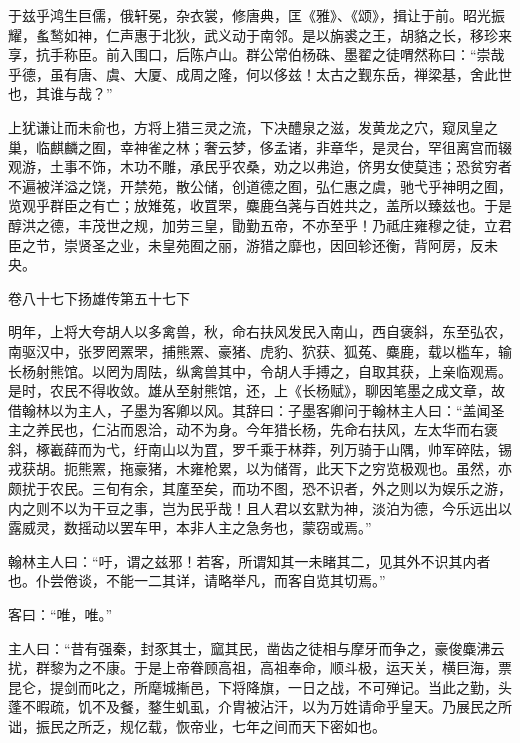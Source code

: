 \documentclass[12pt,UTF8]{ctexbook}
\begin{document}
于兹乎鸿生巨儒，俄轩冕，杂衣裳，修唐典，匡《雅》、《颂》，揖让于前。昭光振耀，蚃鹙如神，仁声惠于北狄，武义动于南邻。是以旃裘之王，胡貉之长，移珍来享，抗手称臣。前入围口，后陈卢山。群公常伯杨硃、墨翟之徒喟然称曰：“崇哉乎德，虽有唐、虞、大厦、成周之隆，何以侈兹！太古之觐东岳，禅梁基，舍此世也，其谁与哉？”



上犹谦让而未俞也，方将上猎三灵之流，下决醴泉之滋，发黄龙之穴，窥凤皇之巢，临麒麟之囿，幸神雀之林；奢云梦，侈孟诸，非章华，是灵台，罕徂离宫而辍观游，土事不饰，木功不雕，承民乎农桑，劝之以弗迨，侪男女使莫违；恐贫穷者不遍被洋溢之饶，开禁苑，散公储，创道德之囿，弘仁惠之虞，驰弋乎神明之囿，览观乎群臣之有亡；放雉菟，收罝罘，麋鹿刍荛与百姓共之，盖所以臻兹也。于是醇洪之德，丰茂世之规，加劳三皇，勖勤五帝，不亦至乎！乃祗庄雍穆之徒，立君臣之节，崇贤圣之业，未皇苑囿之丽，游猎之靡也，因回轸还衡，背阿房，反未央。





卷八十七下扬雄传第五十七下



明年，上将大夸胡人以多禽兽，秋，命右扶风发民入南山，西自褒斜，东至弘农，南驱汉中，张罗罔罴罘，捕熊罴、豪猪、虎豹、狖获、狐菟、麋鹿，载以槛车，输长杨射熊馆。以罔为周阹，纵禽兽其中，令胡人手搏之，自取其获，上亲临观焉。是时，农民不得收敛。雄从至射熊馆，还，上《长杨赋》，聊因笔墨之成文章，故借翰林以为主人，子墨为客卿以风。其辞曰：子墨客卿问于翰林主人曰：“盖闻圣主之养民也，仁沾而恩洽，动不为身。今年猎长杨，先命右扶风，左太华而右褒斜，椓嶻薛而为弋，纡南山以为罝，罗千乘于林莽，列万骑于山隅，帅军碎阹，锡戎获胡。扼熊罴，拖豪猪，木雍枪累，以为储胥，此天下之穷览极观也。虽然，亦颇扰于农民。三旬有余，其廑至矣，而功不图，恐不识者，外之则以为娱乐之游，内之则不以为干豆之事，岂为民乎哉！且人君以玄默为神，淡泊为德，今乐远出以露威灵，数摇动以罢车甲，本非人主之急务也，蒙窃或焉。”



翰林主人曰：“吁，谓之兹邪！若客，所谓知其一未睹其二，见其外不识其内者也。仆尝倦谈，不能一二其详，请略举凡，而客自览其切焉。”



客曰：“唯，唯。”



主人曰：“昔有强秦，封豕其士，窳其民，凿齿之徒相与摩牙而争之，豪俊麋沸云扰，群黎为之不康。于是上帝眷顾高祖，高祖奉命，顺斗极，运天关，横巨海，票昆仑，提剑而叱之，所麾城摲邑，下将降旗，一日之战，不可殚记。当此之勤，头蓬不暇疏，饥不及餐，鍪生虮虱，介胄被沾汗，以为万姓请命乎皇天。乃展民之所诎，振民之所乏，规亿载，恢帝业，七年之间而天下密如也。
\end{document}
